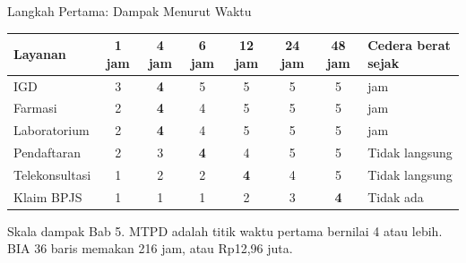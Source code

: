 \documentclass[aspectratio=169, table, 12pt]{beamer}
\begin{document}
\begin{frame}{{\Large Langkah Pertama: Dampak Menurut Waktu}}
  \vspace{2pt}
  \footnotesize
  \begin{tabularx}{\textwidth}{|>{\raggedright\arraybackslash}p{}|c|c|c|c|c|c|>{\raggedright\arraybackslash}X|}
    \hline
    \textbf{Layanan} & \textbf{1 jam} & \textbf{4 jam} & \textbf{6 jam} & \textbf{12 jam} &
    \textbf{24 jam} & \textbf{48 jam} & \textbf{Cedera berat sejak} \\ \hline
    IGD & 3 & \textbf{4} & 5 & 5 & 5 & 5 & 1 jam \\ \hline
    Farmasi & 2 & \textbf{4} & 4 & 5 & 5 & 5 & 4 jam \\ \hline
    Laboratorium & 2 & \textbf{4} & 4 & 5 & 5 & 5 & 4 jam \\ \hline
    Pendaftaran & 2 & 3 & \textbf{4} & 4 & 5 & 5 & Tidak langsung \\ \hline
    Telekonsultasi & 1 & 2 & 2 & \textbf{4} & 4 & 5 & Tidak langsung \\ \hline
    Klaim BPJS & 1 & 1 & 1 & 2 & 3 & \textbf{4} & Tidak ada \\ \hline
  \end{tabularx}

  \vspace{6pt}
  \small Skala dampak Bab 5. MTPD adalah titik waktu pertama bernilai 4 atau lebih. BIA 36 baris
  memakan 216 jam, atau Rp12,96 juta.
\end{frame}
\end{document}
